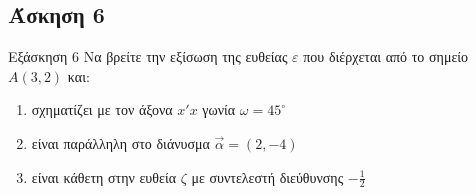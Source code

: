 \documentclass[greek]{beamer}
\begin{document}
\subsection{Άσκηση 6}
\begin{frame}[label=Άσκηση6]{Εξάσκηση 6}
 Να βρείτε την εξίσωση της ευθείας $ε$ που διέρχεται από το σημείο $Α(3,2)$ και:
 \begin{enumerate}
  \item<1-> σχηματίζει με τον άξονα $x'x$ γωνία $ω=45^{\circ}$
  \item<2-> είναι παράλληλη στο διάνυσμα $\vec{α}=(2,-4)$
  \item<3-> είναι κάθετη στην ευθεία $ζ$ με συντελεστή διεύθυνσης $-\frac{1}{2}$
 \end{enumerate}

\end{frame}
%
%
%
%
%
%
%
\end{document}
